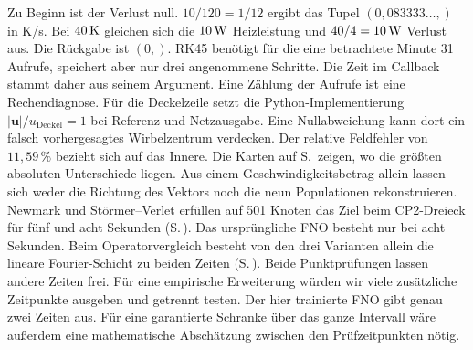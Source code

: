 Zu Beginn ist der Verlust null. \(10/120=1/12\) ergibt das Tupel \((0{,}083333\ldots,)\) in K/s. Bei \(40\,\mathrm{K}\) gleichen sich die \(10\,\mathrm{W}\) Heizleistung und \(40/4=10\,\mathrm{W}\) Verlust aus. Die Rückgabe ist \((0,)\). RK45 benötigt für die eine betrachtete Minute 31 Aufrufe, speichert aber nur drei angenommene Schritte. Die Zeit im Callback stammt daher aus seinem Argument. Eine Zählung der Aufrufe ist eine Rechendiagnose.
Für die Deckelzeile setzt die Python-Implementierung \(|\mathbf u|/u_\mathrm{Deckel}=1\) bei Referenz und Netzausgabe. Eine Nullabweichung kann dort ein falsch vorhergesagtes Wirbelzentrum verdecken. Der relative Feldfehler von \(11{,}59\,\%\) bezieht sich auf das Innere. Die Karten auf S.\, zeigen, wo die größten absoluten Unterschiede liegen. Aus einem Geschwindigkeitsbetrag allein lassen sich weder die Richtung des Vektors noch die neun Populationen rekonstruieren.
Newmark und Störmer--Verlet erfüllen auf 501 Knoten das Ziel beim CP2-Dreieck für fünf und acht Sekunden (S.\,). Das ursprüngliche FNO besteht nur bei acht Sekunden. Beim Operatorvergleich besteht von den drei Varianten allein die lineare Fourier-Schicht zu beiden Zeiten (S.\,). Beide Punktprüfungen lassen andere Zeiten frei. Für eine empirische Erweiterung würden wir viele zusätzliche Zeitpunkte ausgeben und getrennt testen. Der hier trainierte FNO gibt genau zwei Zeiten aus. Für eine garantierte Schranke über das ganze Intervall wäre außerdem eine mathematische Abschätzung zwischen den Prüfzeitpunkten nötig.

